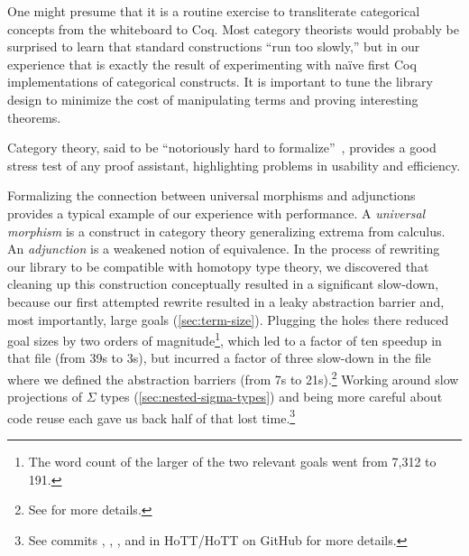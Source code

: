 One might presume that it is a routine exercise to transliterate categorical concepts from the whiteboard to Coq.
Most category theorists would probably be surprised to learn that standard constructions ``run too slowly,'' but in our experience that is exactly the result of experimenting with naïve first Coq implementations of categorical constructs.
It is important to tune the library design to minimize the cost of manipulating terms and proving interesting theorems.

Category theory, said to be ``notoriously hard to formalize''~\cite{harrison1996formalized}, provides a good stress test of any proof assistant, highlighting problems in usability and efficiency.

Formalizing the connection between universal morphisms and adjunctions provides a typical example of our experience with performance.
A \emph{universal morphism} is a construct in category theory generalizing extrema from calculus.
An \emph{adjunction} is a weakened notion of equivalence.
In the process of rewriting our library to be compatible with homotopy type theory, we discovered that cleaning up this construction conceptually resulted in a significant slow-down, because our first attempted rewrite resulted in a leaky abstraction barrier and, most importantly, large goals (\autoref{sec:term-size}).
Plugging the holes there reduced goal sizes by two orders of magnitude\footnote{The word count of the larger of the two relevant goals went from 7,312 to 191.}, which led to a factor of ten speedup in that file (from 39s to 3s), but incurred a factor of three slow-down in the file where we defined the abstraction barriers (from 7s to 21s).\footnote{%
  See  for more details.%
}
Working around slow projections of $\Sigma$ types (\autoref{sec:nested-sigma-types}) and being more careful about code reuse each gave us back half of that lost time.\footnote{%
  See commits , , , and  in HoTT/HoTT on GitHub for more details.%
}

